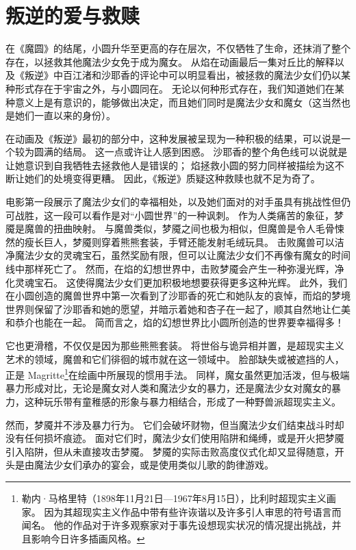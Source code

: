\chapter{叛逆的爱与救赎}
在《魔圆》的结尾，小圆升华至更高的存在层次，不仅牺牲了生命，还抹消了整个存在，以拯救其他魔法少女免于成为魔女。
从焰在动画最后一集对丘比的解释以及《叛逆》中百江渚和沙耶香的评论中可以明显看出，被拯救的魔法少女们仍以某种形式存在于宇宙之外，与小圆同在。
无论以何种形式存在，我们知道她们在某种意义上是有意识的，能够做出决定，而且她们同时是魔法少女和魔女（这当然也是她们一直以来的身份）。

在动画及《叛逆》最初的部分中，这种发展被呈现为一种积极的结果，可以说是一个较为圆满的结局。
这一点或许让人感到困惑。
沙耶香的整个角色线可以说就是让她意识到自我牺牲去拯救他人是错误的；
焰拯救小圆的努力同样被描绘为这不断让她们的处境变得更糟。
因此，《叛逆》质疑这种救赎也就不足为奇了。

电影第一段展示了魔法少女们的幸福相处，以及她们面对的对手虽具有挑战性但仍可战胜，这一段可以看作是对“小圆世界”的一种讽刺。
作为人类痛苦的象征，梦魇是魔兽的扭曲映射。
与魔兽类似，梦魇之间也极为相似，但魔兽是令人毛骨悚然的瘦长巨人，梦魇则穿着熊熊套装，手臂还能发射毛绒玩具。
击败魔兽可以洁净魔法少女的灵魂宝石，虽然奖励有限，但可以让魔法少女们不再像有魔女的时间线中那样死亡了。
然而，在焰的幻想世界中，击败梦魇会产生一种弥漫光辉，净化灵魂宝石。
这使得魔法少女们更加积极地想要获得更多这种光辉。
此外，我们在小圆创造的魔兽世界中第一次看到了沙耶香的死亡和她队友的哀悼，而焰的梦境世界则保留了沙耶香和她的愿望，并暗示着她和杏子在一起了，顺其自然地让仁美和恭介也能在一起。
简而言之，焰的幻想世界比小圆所创造的世界要幸福得多！

它也更滑稽，不仅仅是因为那些熊熊套装。
将世俗与诡异相并置，是超现实主义艺术的领域，魔兽和它们徘徊的城市就在这一领域中。
脸部缺失或被遮挡的人，正是 Magritte\footnote{%
    勒内·马格里特（1898年11月21日—1967年8月15日），比利时超现实主义画家。
    因为其超现实主义作品中带有些许诙谐以及许多引人审思的符号语言而闻名。
    他的作品对于许多观察家对于事先设想现实状况的情况提出挑战，并且影响今日许多插画风格。
}在绘画中所展现的惯用手法。
同样，魔女虽然更加活泼，但与极端暴力形成对比，无论是魔女对人类和魔法少女的暴力，还是魔法少女对魔女的暴力，这种玩乐带有童稚感的形象与暴力相结合，形成了一种野兽派超现实主义。

然而，梦魇并不涉及暴力行为。
它们会破坏财物，但当魔法少女们结束战斗时却没有任何损坏痕迹。
面对它们时，魔法少女们使用陷阱和绳缚，或是开火把梦魇引入陷阱，但从未直接攻击梦魇。
梦魇的实际击败高度仪式化却又显得随意，开头是由魔法少女们承办的宴会，或是使用类似儿歌的韵律游戏。

